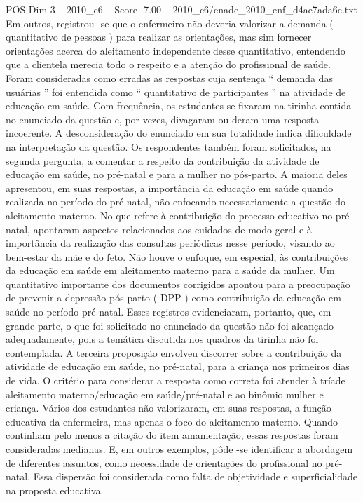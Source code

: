 \begin{textsample}{POS Dim 3 – 2010\_c6 – Score -7.00 – 2010\_c6/enade\_2010\_enf\_d4ae7ada6c.txt}
Em outros, registrou -se que o enfermeiro não deveria valorizar a demanda ( quantitativo de pessoas ) para realizar as orientações, mas sim fornecer orientações acerca do aleitamento independente desse quantitativo, entendendo que a clientela merecia todo o respeito e a atenção do profissional de saúde.
Foram consideradas como erradas as respostas cuja sentença “ demanda das usuárias ” foi entendida como “ quantitativo de participantes ” na atividade de educação em saúde.
Com frequência, os estudantes se fixaram na tirinha contida no enunciado da questão e, por vezes, divagaram ou deram uma resposta incoerente.
A desconsideração do enunciado em sua totalidade indica dificuldade na interpretação da questão.
Os respondentes também foram solicitados, na segunda pergunta, a comentar a respeito da contribuição da atividade de educação em saúde, no pré-natal e para a mulher no pós-parto.
A maioria deles apresentou, em suas respostas, a importância da educação em saúde quando realizada no período do pré-natal, não enfocando necessariamente a questão do aleitamento materno.
No que refere à contribuição do processo educativo no pré-natal, apontaram aspectos relacionados aos cuidados de modo geral e à importância da realização das consultas periódicas nesse período, visando ao bem-estar da mãe e do feto.
Não houve o enfoque, em especial, às contribuições da educação em saúde em aleitamento materno para a saúde da mulher.
Um quantitativo importante dos documentos corrigidos apontou para a preocupação de prevenir a depressão pós-parto ( DPP ) como contribuição da educação em saúde no período pré-natal.
Esses registros evidenciaram, portanto, que, em grande parte, o que foi solicitado no enunciado da questão não foi alcançado adequadamente, pois a temática discutida nos quadros da tirinha não foi contemplada.
A terceira proposição envolveu discorrer sobre a contribuição da atividade de educação em saúde, no pré-natal, para a criança nos primeiros dias de vida.
O critério para considerar a resposta como correta foi atender à tríade aleitamento materno/educação em saúde/pré-natal e ao binômio mulher e criança.
Vários dos estudantes não valorizaram, em suas respostas, a função educativa da enfermeira, mas apenas o foco do aleitamento materno.
Quando continham pelo menos a citação do item amamentação, essas respostas foram consideradas medianas.
E, em outros exemplos, pôde -se identificar a abordagem de diferentes assuntos, como necessidade de orientações do profissional no pré-natal.
Essa dispersão foi considerada como falta de objetividade e superficialidade na proposta educativa.

\end{textsample}
